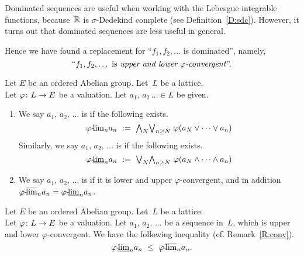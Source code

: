 \documentclass[main.tex]{subfiles}
\begin{document}
\noindent
Dominated sequences
are useful when working with the Lebesgue integrable functions,
because~$\mathbb{R}$ is $\sigma$-Dedekind complete
(see Definition~\ref{D:sdc}).
However, it turns out that dominated sequences
are less useful in general.

Hence we have found a replacement 
for ``$f_1,f_2,\dotsc$ is dominated'',
namely,
\begin{equation*}
\text{``$f_1,f_2,\dotsc$ is \emph{upper and lower $\varphi$-convergent}''.}
\end{equation*}
%
%
\begin{dfn}
\label{D:seq-phi-conv}
Let $E$ be an ordered Abelian group.
Let~$L$ be a lattice.\\
Let $\varphi\colon L \rightarrow E$ be a valuation.
Let $a_1,\, a_2\, \dotsc\in L$ be given.
\begin{enumerate}
\item
We say $a_1,\,a_2,\, \dotsc$
is 
if the following exists.
\begin{equation*}
\pulim\varphi{n}a_n \ \eqdf\ 
\bw_N \bv_{n\geq N}\ \varphi(a_N\vee\dotsb\vee a_n)
\end{equation*}
Similarly,
we say $a_1,\,a_2,\,\dotsc$ is  if
the following exists.
\begin{equation*}
\pllim\varphi{n}a_n \ \eqdf\ 
\bv_N \bw_{n\geq N}\ \varphi(a_N\wedge\dotsb\wedge a_n)
\end{equation*}

\item
We say $a_1,\,a_2,\,\dotsc$
is 
if it is lower and upper $\varphi$-convergent,
and in addition ${\varphi}\text{-}\!\smash{\overline{\lim}_{n}}a_n = {\varphi}\text{-}\!\smash{\underline{\lim}_{n}}a_n$.
\end{enumerate}
\end{dfn}
%
%
\begin{rem}
\label{R:seq-phi-conv}
Let $E$ be an ordered Abelian group.
Let~$L$ be a lattice.\\
Let $\varphi\colon L \rightarrow E$ be a valuation.
Let $a_1,\,a_2,\,\dotsc$ be a sequence in~$L$,
which is upper and lower $\varphi$-convergent.
We have the following inequality
(cf. Remark~\ref{R:conv}).
\begin{equation*}
\pllim\varphi{n}a_n \ \leq\ \pulim\varphi{n}a_n.
\end{equation*}
\end{rem}
%
\end{document}
